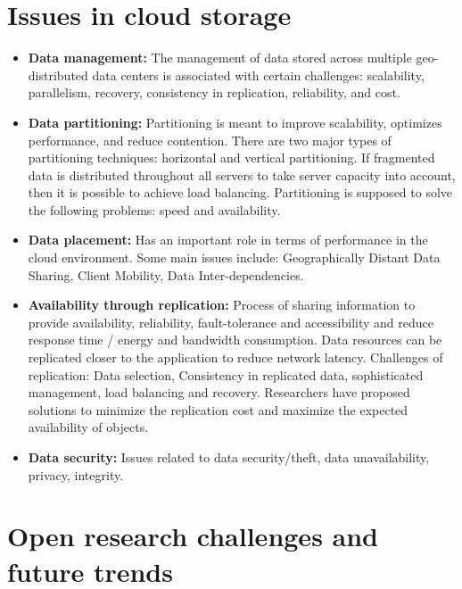 \documentclass[14pt,oneside]{extreport}
\begin{document}
\section{Issues in cloud storage}
\begin{itemize}[noitemsep]

\item \textbf{Data management:} The management of data stored across multiple geo-distributed data centers is associated with certain challenges: scalability, parallelism, recovery, consistency in replication, reliability, and cost.

\item \textbf{Data partitioning:} Partitioning is meant to improve scalability, optimizes performance, and reduce contention. There are two major types of partitioning techniques: horizontal and vertical partitioning. If fragmented data is distributed throughout all servers to take server capacity into account, then it is possible to achieve load balancing. Partitioning is supposed to solve the following problems: speed and availability.

\item \textbf{Data placement:} Has an important role in terms of performance in the cloud environment. Some main issues include: Geographically Distant Data Sharing, Client Mobility, Data Inter-dependencies.

\item \textbf{Availability through replication:} Process of sharing information to provide availability, reliability, fault-tolerance and accessibility and reduce response time / energy and bandwidth consumption. Data resources can be replicated closer to the application to reduce network latency. Challenges of replication: Data selection, Consistency in replicated data, sophisticated management, load balancing and recovery. Researchers have proposed solutions to minimize the replication cost and maximize the expected availability of objects.

\item \textbf{Data security:} Issues related to data security/theft, data unavailability, privacy, integrity.

\end{itemize}

\section{Open research challenges and future trends}
\end{document}
